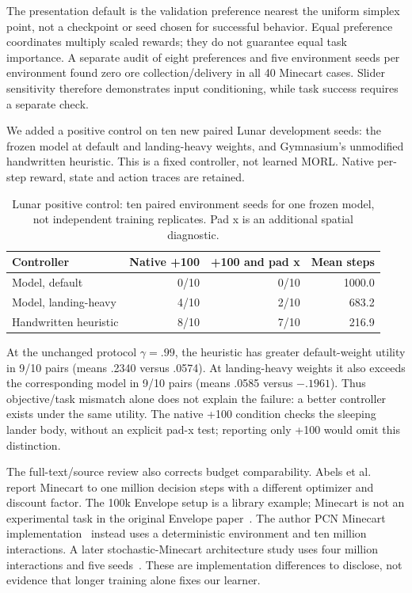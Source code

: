 The presentation default is the validation preference nearest the uniform
simplex point, not a checkpoint or seed chosen for successful behavior.
Equal preference coordinates multiply scaled rewards; they do not guarantee
equal task importance. A separate audit of eight preferences and five environment
seeds per environment found zero ore collection/delivery in all 40 Minecart
cases. Slider sensitivity therefore demonstrates input conditioning, while
task success requires a separate check.

We added a positive control on ten new paired Lunar development seeds:
the frozen model at default and landing-heavy weights, and Gymnasium's
unmodified handwritten heuristic. This is a fixed controller, not learned MORL.
Native per-step reward, state and action traces are retained.
\begin{table}[H]
\centering\small
\caption{Lunar positive control: ten paired environment seeds for one frozen
model, not independent training replicates. Pad x is an additional spatial diagnostic.}
\begin{tabular}{lrrr}
\toprule
Controller & Native +100 & +100 and pad x & Mean steps\\
\midrule
Model, default & 0/10 & 0/10 & 1000.0\\
Model, landing-heavy & 4/10 & 2/10 & 683.2\\
Handwritten heuristic & 8/10 & 7/10 & 216.9\\
\bottomrule
\end{tabular}
\end{table}
At the unchanged protocol $\gamma=.99$, the heuristic has greater
default-weight utility in 9/10 pairs (means .2340 versus .0574).
At landing-heavy weights it also exceeds the corresponding model in 9/10
pairs (means .0585 versus $-.1961$). Thus objective/task mismatch alone does
not explain the failure: a better controller exists under the same utility.
The native +100 condition checks the sleeping lander body, without an explicit
pad-x test; reporting only +100 would omit this distinction.

The full-text/source review also corrects budget comparability.
Abels et al.~\cite{abels2019dynamic-weights} report Minecart to one million
decision steps with a different optimizer and discount factor. The 100k
Envelope setup is a library example; Minecart is not an experimental task in
the original Envelope paper~\cite{yang2019envelope}.
The author PCN Minecart implementation~\cite{reymond2022pcn} instead uses a
deterministic environment and ten million interactions.
A later stochastic-Minecart architecture study uses four million interactions
and five seeds~\cite{terekhov2024architectures}. These are implementation
differences to disclose, not evidence that longer training alone fixes our learner.

